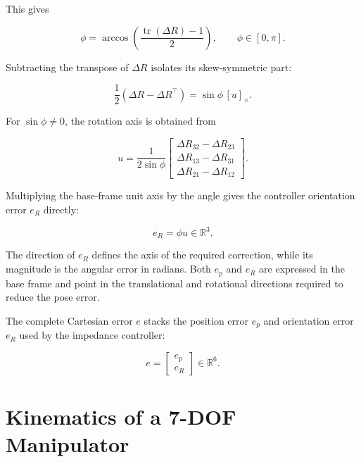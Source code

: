 This gives

\begin{equation}
\phi
=
\arccos\!\left(
\frac{\operatorname{tr}(\Delta R)-1}{2}
\right),
\qquad
\phi\in[0,\pi].
\label{eq:angle_from_trace}
\end{equation}

Subtracting the transpose of \mbox{\(\Delta R\)} isolates its skew-symmetric part:

\begin{equation}
\frac{1}{2}
\left(
\Delta R-\Delta R^\top
\right)
=
\sin\phi\,[u]_\times.
\label{eq:skew_part_rotation_matrix}
\end{equation}

For \mbox{\(\sin\phi\neq0\)}, the rotation axis is obtained from

\begin{equation}
u
=
\frac{1}{2\sin\phi}
\begin{bmatrix}
\Delta R_{32}-\Delta R_{23}\\
\Delta R_{13}-\Delta R_{31}\\
\Delta R_{21}-\Delta R_{12}
\end{bmatrix}.
\label{eq:rotation_axis_from_matrix}
\end{equation}

Multiplying the base-frame unit axis by the angle gives the controller
orientation error \mbox{\(e_R\)} directly:

\begin{equation}
e_R
=
\phi u
\in\mathbb{R}^3.
\label{eq:rotation_error_base_frame}
\end{equation}

The direction of \mbox{\(e_R\)} defines the axis of the required
correction, while its magnitude is the angular error in radians. Both
\mbox{\(e_p\)} and \mbox{\(e_R\)} are expressed in the base frame and
point in the translational and rotational directions required to reduce the
pose error.

The complete Cartesian error \mbox{\(e\)} stacks the position error
\mbox{\(e_p\)} and orientation error \mbox{\(e_R\)} used by the impedance controller:

\begin{equation}
e
=
\begin{bmatrix}
e_p\\
e_R
\end{bmatrix}
\in\mathbb{R}^6.
\label{eq:cartesian_error_vector}
\end{equation}


\section{Kinematics of a 7-DOF Manipulator}
\label{sec:kinematics}


